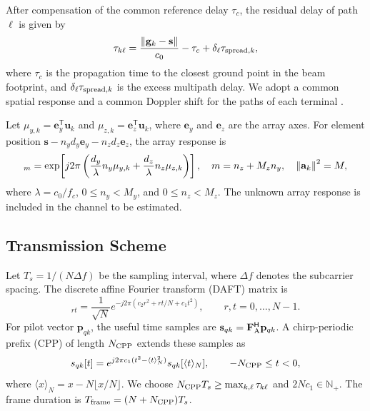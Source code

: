 After compensation of the common reference delay $\tau_c$, the residual
delay of path $\ell$ is given by
\begin{equation}
 \tau_{k\ell}=\frac{\left\lVert\mathbf{g}_k-\mathbf{s}\right\rVert}{c_0}-\tau_c
             +\delta_\ell\tau_{{\rm spread},k},
 \label{eq:path-delay}
\end{equation}
where $\tau_c$ is the propagation time to the closest ground point in the
beam footprint, and $\delta_\ell\tau_{{\rm spread},k}$ is the excess
multipath delay. We adopt a common spatial response and a common Doppler
shift for the paths of each terminal
\cite[Sec.~II-C]{li2023}\cite[Sec.~II]{huang2026}.

Let $\mu_{y,k}=\mathbf e_y^{\mathsf T}\mathbf u_k$ and
$\mu_{z,k}=\mathbf e_z^{\mathsf T}\mathbf u_k$, where $\mathbf e_y$ and
$\mathbf e_z$ are the array axes. For element position
$\mathbf s-n_yd_y\mathbf e_y-n_zd_z\mathbf e_z$, the array response is
\begin{equation}
 [\mathbf{a}_k]_m=
 \exp\!\left[j2\pi\left(
 \frac{d_y}{\lambda}n_y\mu_{y,k}
 +\frac{d_z}{\lambda}n_z\mu_{z,k}\right)\right],
 \quad m=n_z+M_zn_y,\quad \norm{\mathbf{a}_k}^2=M,
 \label{eq:upa}
\end{equation}
where $\lambda=c_0/f_c$, $0\leq n_y<M_y$, and $0\leq n_z<M_z$.
The unknown array response is included in the channel to be estimated.

\subsection{Transmission Scheme}

Let $T_s=1/(N\Delta f)$ be the sampling interval, where $\Delta f$
denotes the subcarrier spacing. The discrete affine Fourier transform
(DAFT) matrix is \cite[Secs.~II-B and III-A]{bemani2022}
\begin{equation}
 [\mathbf{F}_{\rm A}]_{rt}=\frac{1}{\sqrt N}
 e^{-j2\pi(c_2r^2+rt/N+c_1t^2)},
 \qquad r,t=0,\ldots,N-1.
 \label{eq:daft}
\end{equation}
For pilot vector $\mathbf p_{qk}$, the useful time samples are
$\mathbf s_{qk}=\mathbf F_{\rm A}^{\mathsf H}\mathbf p_{qk}$.
A chirp-periodic prefix (CPP) of length $N_{\rm CPP}$ extends these samples as
\begin{equation}
 s_{qk}[t]=e^{j2\pi c_1(t^2-\langle t\rangle_N^2)}
 s_{qk}[\langle t\rangle_N],\qquad -N_{\rm CPP}\leq t<0,
 \label{eq:cpp}
\end{equation}
where $\langle x\rangle_N=x-N\lfloor x/N\rfloor$.
We choose $N_{\rm CPP}T_s\geq\max_{k,\ell}\tau_{k\ell}$ and
$2Nc_1\in\mathbb N_+$. The frame duration is
$T_{\rm frame}=(N+N_{\rm CPP})T_s$.

